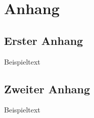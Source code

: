 	
	
	
	
	\newpage
	\printglossary[type=symbolslist, style=MyStyle]
	\newpage
	
	\cleardoublepage %
	
	
	
	
	
	
	
	\appendix
	\part*{Anhang}
	\chapter{Erster Anhang}
	Beispieltext
	
	
	
	
	\chapter{Zweiter Anhang}
	Beispieltext
	
	
	
		
	
	



